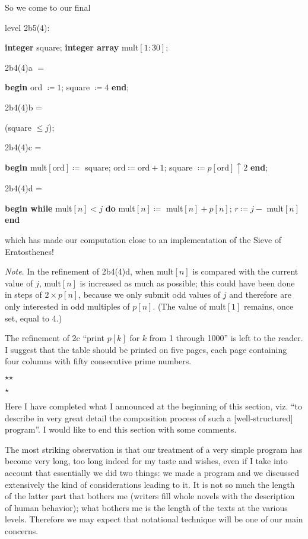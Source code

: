 So we come to our final

\noindent
level 2b5(4):

\noindent
\textbf{integer} square; \textbf{integer array} mult$[1 : 30]$;

\noindent
2b4(4)a $=$

\noindent
\textbf{begin} ord $\coloneq 1$; square $\coloneq 4$ \textbf{end};

\noindent
2b4(4)b =

\noindent
\quad (square $\leqslant j$);

\noindent
2b4(4)c =

\noindent
\textbf{begin} mult$[\text{ord}] \coloneq$ square; $\text{ord} \coloneq \text{ord} + 1$; square $\coloneq p[\text{ord}] \uparrow 2$ \textbf{end};

\noindent
2b4(4)d =

\noindent
\textbf{begin while} mult$[n] < j$ \textbf{do} mult$[n]\coloneq$ mult$[n] + p[n]$; $r\coloneq j -$ mult$[n]$ \textbf{end}

\noindent
which has made our computation close to an implementation of the Sieve of Eratosthenes!

\noindent
\textit{Note}. In the refinement of 2b4(4)d, when mult$[n]$ is compared with the current value of $j$, mult$[n]$ is increased as much as possible; this could have been done in steps of $2\times p[n]$, because we only submit odd values of $j$ and therefore are only interested in odd multiples of $p[n]$. (The value of mult$[1]$ remains, once set, equal to 4.)

The refinement of 2c ``print $p[k]$ for $k$ from 1 through 1000'' is left to the reader. I suggest that the table should be printed on five pages, each page containing four columns with fifty consecutive prime numbers.

\vspace*{-1em}
\begin{center}
	$\star$\quad\quad  $\star$\\
	\nopagebreak
	
	\vspace*{-.5em}
	$\star$
\end{center}
\vspace*{-1em}

Here I have completed what I announced at the beginning of this section, viz. ``to describe in very great detail the composition process of such a [well-structured] program''. I would like to end this section with some comments.

The most striking observation is that our treatment of a very simple program has become very long, too long indeed for my taste and wishes, even if I take into account that essentially we did two things: we made a program and we discussed extensively the kind of considerations leading to it. It is not so much the length of the latter part that bothers me (writers fill whole novels with the description of human behavior); what bothers me is the length of the texts at the various levels. Therefore we may expect that notational technique will be one of our main concerns.

